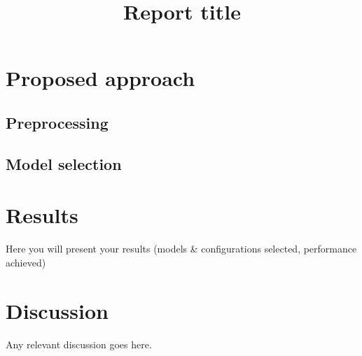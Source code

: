 \documentclass[conference]{IEEEtran}
\begin{document}
\title{Report title}

\author{
\and
{}
}

\maketitle







\section{Proposed approach}


\subsection{Preprocessing}

\subsection{Model selection}

\newline



\newline


\section{Results}
Here you will present your results (models \& configurations selected, performance achieved)

\section{Discussion}
Any relevant discussion goes here.



\end{document}
